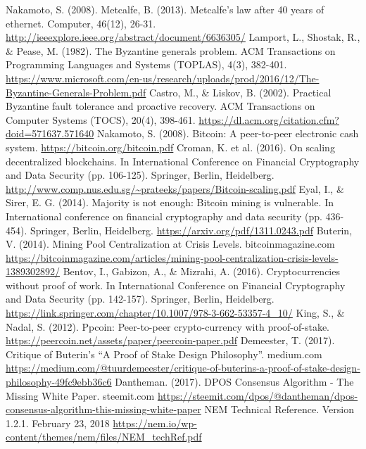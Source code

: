 \documentclass[a4paper,12pt]{article}
\begin{document}
\begin{thebibliography}{99}
 Nakamoto, S. (2008). Metcalfe, B. (2013). Metcalfe's law after 40 years of ethernet. Computer, 46(12), 26-31.
 \url{http://ieeexplore.ieee.org/abstract/document/6636305/}
 Lamport, L., Shostak, R., \& Pease, M. (1982). The Byzantine generals problem. ACM Transactions on Programming Languages and Systems (TOPLAS), 4(3), 382-401.
 \url{https://www.microsoft.com/en-us/research/uploads/prod/2016/12/The-Byzantine-Generals-Problem.pdf}
  Castro, M., \& Liskov, B. (2002). Practical Byzantine fault tolerance and proactive recovery. ACM Transactions on Computer Systems (TOCS), 20(4), 398-461.
 \url{https://dl.acm.org/citation.cfm?doid=571637.571640}
 Nakamoto, S. (2008). Bitcoin: A peer-to-peer electronic cash system.
 \url{https://bitcoin.org/bitcoin.pdf}
  Croman, K. et al. (2016). On scaling decentralized blockchains. In International Conference on Financial Cryptography and Data Security (pp. 106-125). Springer, Berlin, Heidelberg.
 \url{http://www.comp.nus.edu.sg/~prateeks/papers/Bitcoin-scaling.pdf}
  Eyal, I., \& Sirer, E. G. (2014). Majority is not enough: Bitcoin mining is vulnerable. In International conference on financial cryptography and data security (pp. 436-454). Springer, Berlin, Heidelberg.
 \url{https://arxiv.org/pdf/1311.0243.pdf}
  Buterin, V. (2014). Mining Pool Centralization at Crisis Levels. bitcoinmagazine.com
 \url{https://bitcoinmagazine.com/articles/mining-pool-centralization-crisis-levels-1389302892/}
  Bentov, I., Gabizon, A., \& Mizrahi, A. (2016). Cryptocurrencies without proof of work. In International Conference on Financial Cryptography and Data Security (pp. 142-157). Springer, Berlin, Heidelberg.
 \url{https://link.springer.com/chapter/10.1007/978-3-662-53357-4_10/}
  King, S., \& Nadal, S. (2012). Ppcoin: Peer-to-peer crypto-currency with proof-of-stake. 
 \url{https://peercoin.net/assets/paper/peercoin-paper.pdf}
  Demeester, T. (2017). Critique of Buterin’s “A Proof of Stake Design Philosophy”. medium.com 
 \url{https://medium.com/@tuurdemeester/critique-of-buterins-a-proof-of-stake-design-philosophy-49fc9ebb36c6}
  Dantheman. (2017). DPOS Consensus Algorithm - The Missing White Paper. steemit.com 
 \url{https://steemit.com/dpos/@dantheman/dpos-consensus-algorithm-this-missing-white-paper}
  NEM Technical Reference. Version 1.2.1. February 23, 2018
 \url{https://nem.io/wp-content/themes/nem/files/NEM_techRef.pdf}
 
\end{thebibliography}

\tableofcontents
\end{document}
